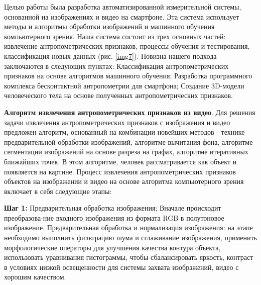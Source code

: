 Целью работы была разработка автоматизированной измерительной системы, основанной на изображениях и видео на смартфоне. Эта система использует методы и алгоритмы обработки изображений и машинного обучения компьютерного зрения.
Наша система состоит из трех основных частей: извлечение антропометрических признаков, процессы обучения и тестирования, классификация новых данных (рис. \ref{img7}). Новизна нашего подхода заключаются в следующих пунктах: Классификация антропометрических признаков на основе алгоритмов машинного обучения; Разработка программного комплекса бесконтактной антропометрии для смартфона; Создание 3D-модели человеческого тела на основе полученных антропометрических признаков.

\textbf {Алгоритм извлечения антропометрических признаков из видео}. Для решения задачи извлечения антропометрических признаков с изображения и видео предложен алгоритм, основанный на  комбинации новейших методов - технике предварительной обработки изображений, алгоритме вычитания фона, алгоритме сегментации изображений на основе разреза на графах, алгоритме итеративных ближайших точек. В этом алгоритме, человек рассматривается как объект и появляется на картине. Процесс извлечения антропометрических признаков объектов на изображении и видео на основе алгоритма компьютерного зрения включает в себя следующие этапы:

\textbf{Шаг 1:} Предварительная обработка изображения;
Вначале происходит преобразова-ние входного изображения из формата RGB в полутоновое изображение. Предварительная обработка и нормализация изображения: на этапе необходимо выполнить фильтрацию шума и сглаживание изображения, применить морфологические операторы для улучшения качества контура объекта, использовать уравнивания гистограммы, чтобы сбалансировать яркость, контраст в условиях низкой освещенности для системы захвата изображений, видео с хорошим качеством.

